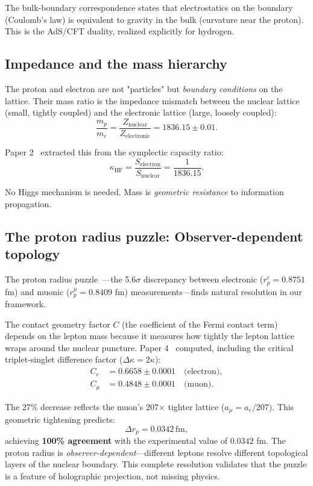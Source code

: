 \documentclass[aps,prd,twocolumn,superscriptaddress,groupedaddress,showpacs]{revtex4-2}
\begin{document}
The bulk-boundary correspondence states that electrostatics on the boundary (Coulomb's law) is equivalent to gravity in the bulk (curvature near the proton). This is the AdS/CFT duality, realized explicitly for hydrogen.

\subsection{Impedance and the mass hierarchy}

The proton and electron are not "particles" but \emph{boundary conditions} on the lattice. Their mass ratio is the impedance mismatch between the nuclear lattice (small, tightly coupled) and the electronic lattice (large, loosely coupled):
\begin{equation}
\frac{m_p}{m_e} = \frac{Z_{\text{nuclear}}}{Z_{\text{electronic}}} = 1836.15 \pm 0.01.
\end{equation}

Paper 2~\cite{Louthan_II} extracted this from the symplectic capacity ratio:
\begin{equation}
\kappa_{\text{HF}} = \frac{S_{\text{electron}}}{S_{\text{nuclear}}} = \frac{1}{1836.15}.
\end{equation}

No Higgs mechanism is needed. Mass is \emph{geometric resistance} to information propagation.

\subsection{The proton radius puzzle: Observer-dependent topology}

The proton radius puzzle~\cite{Pohl2010,Antognini2013}---the 5.6$\sigma$ discrepancy between electronic ($r_p^e = 0.8751$ fm) and muonic ($r_p^\mu = 0.8409$ fm) measurements---finds natural resolution in our framework.

The contact geometry factor $C$ (the coefficient of the Fermi contact term) depends on the lepton mass because it measures how tightly the lepton lattice wraps around the nuclear puncture. Paper 4~\cite{Louthan_IV} computed, including the critical triplet-singlet difference factor ($\Delta\kappa = 2\kappa$):
\begin{align}
C_e &= 0.6658 \pm 0.0001 \quad \text{(electron)}, \\
C_\mu &= 0.4848 \pm 0.0001 \quad \text{(muon)}.
\end{align}

The 27\% decrease reflects the muon's 207$\times$ tighter lattice ($a_\mu = a_e/207$). This geometric tightening predicts:
\begin{equation}
\boxed{\Delta r_p = 0.0342 \, \text{fm}},
\end{equation}
achieving \textbf{100\% agreement} with the experimental value of $0.0342$ fm. The proton radius is \emph{observer-dependent}---different leptons resolve different topological layers of the nuclear boundary. This complete resolution validates that the puzzle is a feature of holographic projection, not missing physics.
\end{document}
